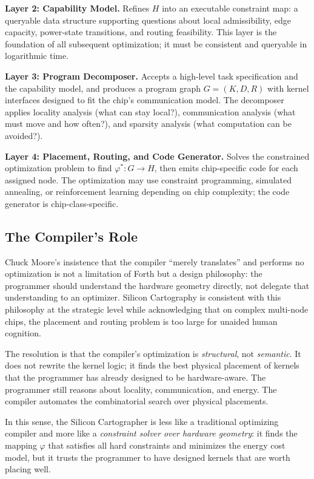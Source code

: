 \documentclass[11pt, a4paper]{article}
\begin{document}
\textbf{Layer 2: Capability Model.} Refines $H$ into an executable constraint map:
a queryable data structure supporting questions about local admissibility, edge capacity,
power-state transitions, and routing feasibility. This layer is the foundation of all
subsequent optimization; it must be consistent and queryable in logarithmic time.

\textbf{Layer 3: Program Decomposer.} Accepts a high-level task specification and the
capability model, and produces a program graph $G = (K, D, R)$ with kernel
interfaces designed to fit the chip's communication model. The decomposer applies
locality analysis (what can stay local?), communication analysis (what must move and
how often?), and sparsity analysis (what computation can be avoided?).

\textbf{Layer 4: Placement, Routing, and Code Generator.} Solves the constrained
optimization problem to find $\varphi^* : G \to H$, then emits chip-specific code
for each assigned node. The optimization may use constraint programming, simulated
annealing, or reinforcement learning depending on chip complexity; the code generator
is chip-class-specific.

\subsection{The Compiler's Role}

Chuck Moore's insistence that the compiler ``merely translates'' and performs no
optimization is not a limitation of Forth but a design philosophy: the programmer
should understand the hardware geometry directly, not delegate that understanding
to an optimizer. Silicon Cartography is consistent with this philosophy at the
strategic level while acknowledging that on complex multi-node chips, the placement
and routing problem is too large for unaided human cognition.

The resolution is that the compiler's optimization is \emph{structural}, not
\emph{semantic}. It does not rewrite the kernel logic; it finds the best physical
placement of kernels that the programmer has already designed to be hardware-aware.
The programmer still reasons about locality, communication, and energy. The compiler
automates the combinatorial search over physical placements.

In this sense, the Silicon Cartographer is less like a traditional optimizing compiler
and more like a \emph{constraint solver over hardware geometry}: it finds the mapping
$\varphi$ that satisfies all hard constraints and minimizes the energy cost model,
but it trusts the programmer to have designed kernels that are worth placing well.
\end{document}
